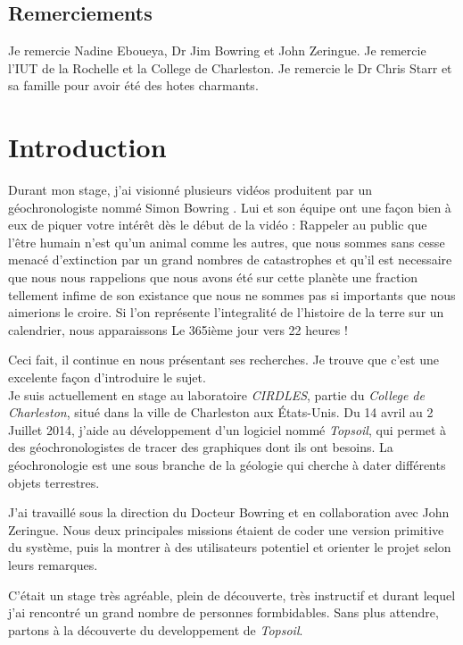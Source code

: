 \section{Remerciements}
Je remercie Nadine Eboueya, Dr Jim Bowring et John Zeringue. Je remercie l'IUT de la Rochelle et la College de Charleston. Je remercie le Dr Chris Starr et sa famille pour avoir été des hotes charmants.

\chapter{Introduction}

Durant mon stage, j'ai visionné plusieurs vidéos produitent par un géochronologiste nommé Simon Bowring%
. Lui et son équipe ont une façon bien à eux de piquer votre intérêt dès le début de la vidéo : Rappeler au public que l'être humain n'est qu'un animal comme les autres, que nous sommes sans cesse menacé d'extinction par un grand nombres de catastrophes et qu'il est necessaire que nous nous rappelions que nous avons été sur cette planète une fraction tellement infime de son existance que nous ne sommes pas si importants que nous aimerions le croire. Si l'on représente l'integralité de l'histoire de la terre sur un calendrier, nous apparaissons Le 365ième jour vers 22 heures !

Ceci fait, il continue en nous présentant ses recherches. Je trouve que c'est une excelente façon d'introduire le sujet.\\

Je suis actuellement en stage au laboratoire \textit{CIRDLES}, partie du \textit{College de Charleston}, situé dans la ville de Charleston aux États-Unis. %
Du 14 avril au 2 Juillet 2014, j'aide au développement d'un logiciel nommé \textit{Topsoil}, qui permet à des géochronologistes de tracer des graphiques dont ils ont besoins. La géochronologie est une sous branche de la géologie qui cherche à dater différents objets terrestres. 

J'ai travaillé sous la direction du Docteur Bowring et en collaboration avec John Zeringue. Nous deux principales missions étaient de coder une version primitive du système, puis la montrer à des utilisateurs potentiel et orienter le projet selon leurs remarques.

C'était un stage très agréable, plein de découverte, très instructif et durant lequel j'ai rencontré un grand nombre de personnes formbidables. Sans plus attendre, partons à la découverte du developpement de \textit{Topsoil}.
